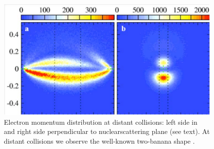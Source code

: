 \documentclass[12pt]{article}
\begin{document}
\begin{figure}
\begin{center}
\includegraphics[scale=0.4]{figures/HeExp_results}
\caption{Electron momentum distribution at distant collisions: left side in and right side perpendicular to nuclearscattering plane (see text). At distant collisions we observe the well-known two-banana shape \citep{SchmidtLEtal2014Vortices}.}
\label{fig:HeExp_results}
\end{center}
\end{figure}
%
%
\end{document}
